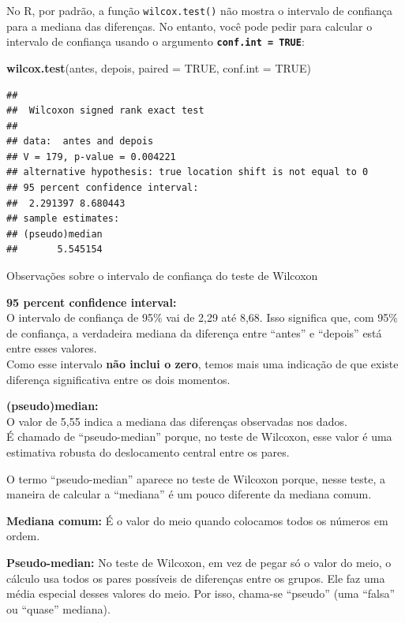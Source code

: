 \documentclass[
]{book}
\newenvironment{Shaded}{\begin{snugshade}}{\end{snugshade}}
\newcommand{\AttributeTok}[1]{\textcolor[rgb]{0.13,0.29,0.53}{#1}}
\newcommand{\ConstantTok}[1]{\textcolor[rgb]{0.56,0.35,0.01}{#1}}
\newcommand{\FunctionTok}[1]{\textcolor[rgb]{0.13,0.29,0.53}{\textbf{#1}}}
\newcommand{\NormalTok}[1]{#1}
\begin{document}
No R, por padrão, a função \texttt{wilcox.test()} não mostra o intervalo de confiança para a mediana das diferenças.
No entanto, você pode pedir para calcular o intervalo de confiança usando o argumento \textbf{\texttt{conf.int\ =\ TRUE}}:

\begin{Shaded}
\begin{Highlighting}[]
\FunctionTok{wilcox.test}\NormalTok{(antes, depois, }\AttributeTok{paired =} \ConstantTok{TRUE}\NormalTok{, }\AttributeTok{conf.int =} \ConstantTok{TRUE}\NormalTok{)}
\end{Highlighting}
\end{Shaded}

\begin{verbatim}
## 
##  Wilcoxon signed rank exact test
## 
## data:  antes and depois
## V = 179, p-value = 0.004221
## alternative hypothesis: true location shift is not equal to 0
## 95 percent confidence interval:
##  2.291397 8.680443
## sample estimates:
## (pseudo)median 
##       5.545154
\end{verbatim}

Observações sobre o intervalo de confiança do teste de Wilcoxon

\textbf{95 percent confidence interval:}\\
O intervalo de confiança de 95\% vai de 2,29 até 8,68. Isso significa que, com 95\% de confiança, a verdadeira mediana da diferença entre ``antes'' e ``depois'' está entre esses valores.\\
Como esse intervalo \textbf{não inclui o zero}, temos mais uma indicação de que existe diferença significativa entre os dois momentos.

\textbf{(pseudo)median:}\\
O valor de 5,55 indica a mediana das diferenças observadas nos dados.\\
É chamado de ``pseudo-median'' porque, no teste de Wilcoxon, esse valor é uma estimativa robusta do deslocamento central entre os pares.

O termo ``pseudo-median'' aparece no teste de Wilcoxon porque, nesse teste, a maneira de calcular a ``mediana'' é um pouco diferente da mediana comum.

\textbf{Mediana comum:} É o valor do meio quando colocamos todos os números em ordem.

\textbf{Pseudo-median:} No teste de Wilcoxon, em vez de pegar só o valor do meio, o cálculo usa todos os pares possíveis de diferenças entre os grupos. Ele faz uma média especial desses valores do meio. Por isso, chama-se ``pseudo'' (uma ``falsa'' ou ``quase'' mediana).
\end{document}
